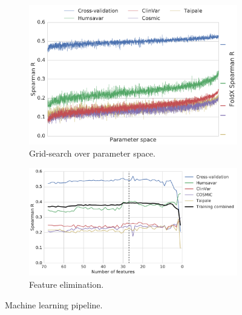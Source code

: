 \begin{figure}[ht]
	\begin{subfigure}[b]{0.6\textwidth}
		\includegraphics[width=1\linewidth]{static/elaspic_training_set/machine_learning/gridsearch_core.pdf}
		\caption{Grid-search over parameter space.}
		\label{fig:gridsearch_core}
	\end{subfigure}

	\begin{subfigure}[b]{0.75\textwidth}
		\includegraphics[width=1\linewidth]{static/elaspic_training_set/machine_learning/feature_elimination_core.pdf}
		\caption{Feature elimination.}
		\label{fig:feature_elimination_core}
	\end{subfigure}

	\caption{Machine learning pipeline.}
\end{figure}


\clearpage

